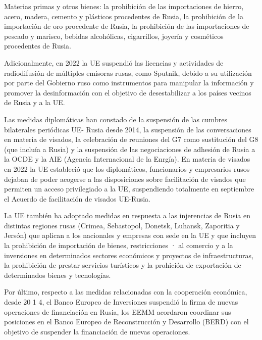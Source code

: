 \documentclass[10pt,a4paper]{article}
\begin{document}
Materias primas y otros bienes: la prohibición de las importaciones de hierro, acero, madera, cemento y plásticos procedentes de Rusia, la prohibición de la importación de oro procedente de Rusia, la prohibición de las importaciones de pescado y marisco, bebidas alcohólicas, cigarrillos, joyería y cosméticos procedentes de Rusia.

Adicionalmente, en 2022 la UE suspendió las licencias y actividades de radiodifusión de múltiples emisoras rusas, como Sputnik, debido a su utilización por parte del Gobierno ruso como instrumentos para manipular la información y promover la desinformación con el objetivo de desestabilizar a los países vecinos de Rusia y a la UE.

Las medidas diplomáticas han constado de la suspensión de las cumbres bilaterales periódicas UE- Rusia desde 2014, la suspensión de las conversaciones en materia de visados, la celebración de reuniones del G7 como sustitución del G8 (que incluía a Rusia) y la suspensión de las negociaciones de adhesión de Rusia a la OCDE y la AIE (Agencia Internacional de la Enrgía). En materia de visados en 2022 la UE estableció que los diplomáticos, funcionarios y empresarios rusos dejaban de poder acogerse a las disposiciones sobre facilitación de visados que permiten un acceso privilegiado a la UE, suspendiendo totalmente en septiembre el Acuerdo de facilitación de visados UE-Rusia.

La UE también ha adoptado medidas en respuesta a las injerencias de Rusia en distintas regiones rusas (Crimea, Sebastopol, Donetsk, Luhansk, Zaporitia y Jersón) que aplican a los nacionales y empresas con sede en la UE y que incluyen la prohibición de importación de bienes, restricciones · al comercio y a la inversiones en determinados sectores económicos y proyectos de infraestructuras, la prohibición de prestar servicios turísticos y la prohición de exportación de determinados bienes y tecnologías.

Por último, respecto a las medidas relacionadas con la cooperación económica, desde 20 1 4, el Banco Europeo de Inversiones suspendió la firma de nuevas operaciones de financiación en Rusia, los EEMM acordaron coordinar sus posiciones en el Banco Europeo de Reconstrucción y Desarrollo (BERD) con el objetivo de suspender la financiación de nuevas operaciones.
\end{document}
